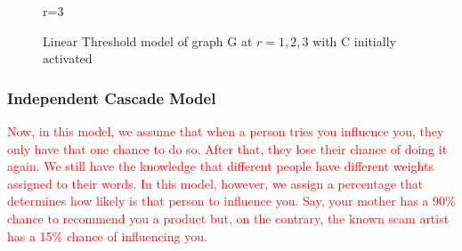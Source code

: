 \begin{figure}[h!]
\begin{minipage}{0.45\textwidth}
\caption{r=3}
	\end{minipage}
\caption{Linear Threshold model of graph G at $r=1,2,3$ with C initially activated}
\label{linearfig}
\end{figure}

\subsubsection{Independent Cascade Model}
\textcolor{red}{Now, in this model, we assume that when a person tries you influence you, they only have that one chance to do so. After that, they lose their chance of doing it again. We still have the knowledge that different people have different weights assigned to their words. In this model, however, we assign a percentage that determines how likely is that person to influence you. Say, your mother has a 90\% chance to recommend you a product but, on the contrary, the known scam artist has a 15\% chance of influencing you.}

